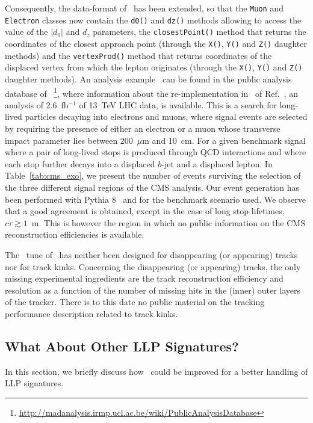 Consequently, the data-format of \MA\ has been extended, so that the \verb+Muon+ and
\verb+Electron+ classes now contain the \verb+d0()+ and \verb+dz()+ methods allowing to
access the value of the $|d_0|$ and $d_z$ parameters, the \verb+closestPoint()+
method that returns the coordinates of the closest approach point (through the
\verb+X()+, \verb+Y()+ and \verb+Z()+ daughter methods) and the
\verb+vertexProd()+ method that returns coordinates of the displaced vertex from
which the lepton originates (through the \verb+X()+, \verb+Y()+ and
\verb+Z()+ daughter methods). An analysis example~\cite{MA5:longlivedleptons} can be found in the public analysis database of \MA~\footnote{ \url{http://madanalysis.irmp.ucl.ac.be/wiki/PublicAnalysisDatabase}},
where information about the re-implementation in \MA\ of Ref.~\cite{CMS-PAS-EXO-16-022}, an  
analysis of 2.6~fb$^{-1}$ of 13~TeV LHC data, is available. This is a search for long-lived particles decaying into electrons and muons, where signal
events are selected by requiring the presence of either an electron or a muon
whose transverse impact parameter lies between 200~$\mu$m and 10~cm. For a given
benchmark signal where a pair of long-lived stops is produced through QCD
interactions and where each stop further decays into a displaced $b$-jet and a
displaced lepton. In Table~\ref{tab:cms_exo}, we present the number of events
surviving the selection of the three different signal regions of the CMS analysis.
Our event generation has been performed with {\sc Pythia} 8~\cite{Sjostrand:2007gs}
and for the benchmark scenario used.
We observe that a good agreement is obtained, except in the case of long stop
lifetimes, $c\tau \gtrsim 1$~m. 
This is however the region in which no public information on
the CMS reconstruction efficiencies is available.

The \MA\ tune of \DEL\ has neither been designed for disappearing
(or appearing) tracks nor for track kinks. Concerning the disappearing (or appearing)
tracks, the only missing experimental ingredients are the track reconstruction efficiency
and resolution as a function of the number of missing hits in the (inner) outer
layers of the tracker. There is to this date no public material on the tracking
performance description related to track kinks.

\subsection{What About Other LLP Signatures?}

In this section, we briefly discuss how \DEL\ could be improved for a better
handling of LLP signatures.

